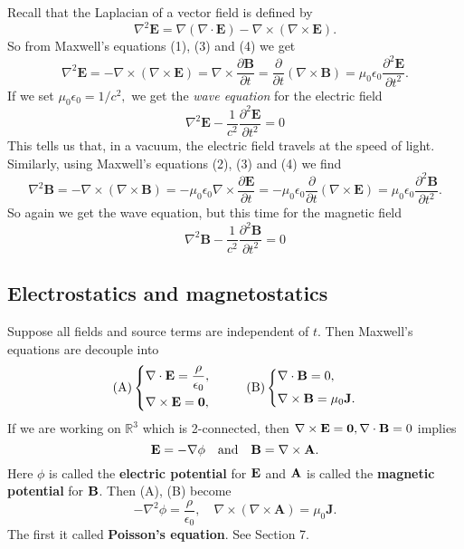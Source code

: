 Recall that the Laplacian of a vector field is defined by
\[
    \nabla^{2} \mathbf{E}=\nabla(\nabla \cdot \mathbf{E})-\nabla \times(\nabla \times \mathbf{E}).
\]
So from Maxwell's equations (1), (3) and (4) we get
\[
    \nabla^{2} \mathbf{E}=-\nabla \times(\nabla \times \mathbf{E})=\nabla \times \frac{\partial \mathbf{B}}{\partial t}=\frac{\partial}{\partial t}(\nabla \times \mathbf{B})=\mu_{0} \epsilon_{0} \frac{\partial^{2} \mathbf{E}}{\partial t^{2}}.
\]
If we set $\mu_{0} \epsilon_{0}=1 / c^{2},$ we get the \textit{wave equation} for the electric field
\[
    \boxed{\nabla^{2} \mathbf{E}-\frac{1}{c^{2}} \frac{\partial^{2} \mathbf{E}}{\partial t^{2}}=0}
\]
This tells us that, in a vacuum, the electric field travels at the speed of light. Similarly, using Maxwell's equations (2), (3) and (4) we find
\[
    \nabla^{2} \mathbf{B}=-\nabla \times(\nabla \times \mathbf{B})=-\mu_{0} \epsilon_{0} \nabla \times \frac{\partial \mathbf{E}}{\partial t}=-\mu_{0} \epsilon_{0} \frac{\partial}{\partial t}(\nabla \times \mathbf{E})=\mu_{0} \epsilon_{0} \frac{\partial^{2} \mathbf{B}}{\partial t^{2}}.
\]
So again we get the wave equation, but this time for the magnetic field
\[
    \boxed{\nabla^{2} \mathbf{B}-\frac{1}{c^{2}} \frac{\partial^{2} \mathbf{B}}{\partial t^{2}}=0}
\]

\subsection{Electrostatics and magnetostatics}
Suppose all fields and source terms are independent of $t$. Then Maxwell's equations are decouple into 
\[
    (\text{A})\left\{ \begin{aligned}
         &\nabla\cdot{\bf E} = \frac{\rho}{\epsilon_0},\\ 
         &\nabla\times{\bf E} = \mathbf{0},
    \end{aligned} \right. ~~~~~~~~ (\text{B})\left\{ \begin{aligned}
        &\nabla\cdot{\bf B} = 0,\\[3pt]
        &\nabla\times{\bf B} = \mu_0{\bf J}.
   \end{aligned} \right.
\]
If we are working on $ \mathbb{R}^{3} $ which is 2-connected, then $ \nabla\times{\bf E} = \mathbf{0},\nabla\cdot{\bf B}=0 $ implies 
\[
    {\bf E} = - \nabla\phi\quad \text{and}\quad {\bf B} = \nabla\times{\bf A}.
\]
Here $ \phi $ is called the \textbf{electric potential} for ${\bf E}$ and $ {\bf A} $ is called the \textbf{magnetic potential} for $ {\bf B} $. Then (A), (B) become
\[
    -\nabla^{2} \phi=\frac{\rho}{\epsilon_{0}}, \quad \nabla \times(\nabla \times \mathbf{A})=\mu_{0} \mathbf{J}.
\]
The first it called \textbf{Poisson's equation}. See Section 7.

